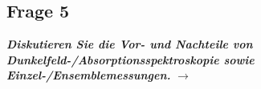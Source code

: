 \subsection{\label{subsec:FZV5}Frage 5}
\textbf{\textit{Diskutieren Sie die Vor- und Nachteile von Dunkelfeld-/Absorptionsspektroskopie
sowie Einzel-/Ensemblemessungen.}}
$\rightarrow$